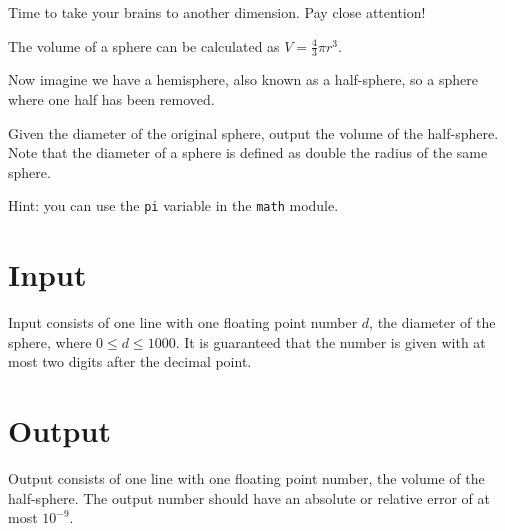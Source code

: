
Time to take your brains to another dimension. Pay close attention!

The volume of a sphere can be calculated as $V = \frac{4}{3} \pi r^3$.

Now imagine we have a hemisphere, also known as a half-sphere, so a sphere where one half has been removed.

Given the diameter of the original sphere, output the volume of the half-sphere.
Note that the diameter of a sphere is defined as double the radius of the same sphere.

Hint: you can use the \texttt{pi} variable in the \texttt{math} module.

\section*{Input}
Input consists of one line with one floating point number $d$, the diameter of the sphere, where $0 \leq d \leq 1000$.
It is guaranteed that the number is given with at most two digits after the decimal point.

\section*{Output}
Output consists of one line with one floating point number, the volume of the half-sphere.
The output number should have an absolute or relative error of at most $10^{-9}$.
